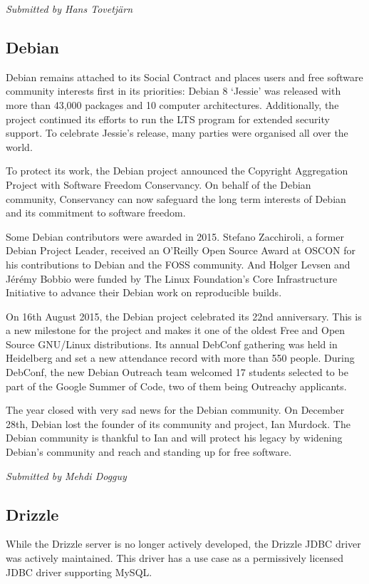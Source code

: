 \documentclass[letterpaper]{report}
\begin{document}
{\em Submitted by Hans Tovetjärn}

\subsection{Debian}

Debian remains attached to its Social Contract and places users and free
software community interests first in its priorities: Debian 8 `Jessie'
was released with more than 43,000 packages and 10 computer architectures.
Additionally, the project continued its efforts to run the LTS program for
extended security support.  To celebrate Jessie's release, many parties
were organised all over the world.

To protect its work, the Debian project announced the Copyright
Aggregation Project with Software Freedom Conservancy.  On behalf of the
Debian community, Conservancy can now safeguard the long term interests of
Debian and its commitment to software freedom.

Some Debian contributors were awarded in 2015.  Stefano Zacchiroli, a
former Debian Project Leader, received an O'Reilly Open Source Award at
OSCON for his contributions to Debian and the FOSS community.  And Holger
Levsen and Jérémy Bobbio were funded by The Linux Foundation's Core
Infrastructure Initiative to advance their Debian work on reproducible
builds.

On 16th August 2015, the Debian project celebrated its 22nd anniversary.
This is a new milestone for the project and makes it one of the oldest
Free and Open Source GNU/Linux distributions.  Its annual DebConf
gathering was held in Heidelberg and set a new attendance record with more
than 550 people.  During DebConf, the new Debian Outreach team welcomed 17
students selected to be part of the Google Summer of Code, two of them
being Outreachy applicants.

The year closed with very sad news for the Debian community.  On December
28th, Debian lost the founder of its community and project, Ian Murdock.
The Debian community is thankful to Ian and will protect his legacy by
widening Debian's community and reach and standing up for free software.

{\em Submitted by Mehdi Dogguy}

\subsection{Drizzle}

While the Drizzle server is no longer actively developed, the Drizzle JDBC
driver was actively maintained.  This driver has a use case as a
permissively licensed JDBC driver supporting MySQL.
\end{document}
